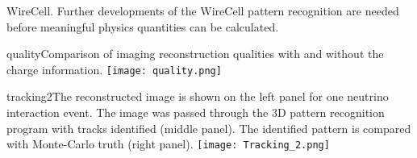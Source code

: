 WireCell. 
Further developments of the WireCell pattern recognition 
are needed before meaningful physics quantities can be calculated.
%
\begin{cdrfigure}{quality}{Comparison of imaging reconstruction 
qualities with and without the charge information. }
\texttt{[image: quality.png]}
\end{cdrfigure}
%
%
\begin{cdrfigure}{tracking2}{The reconstructed image is shown 
on the left panel for one neutrino interaction event. The image 
was passed through the 3D pattern recognition program with tracks 
identified (middle panel). The identified pattern is compared 
with Monte-Carlo truth (right panel).}
 \texttt{[image: Tracking\_2.png]}
\end{cdrfigure}


